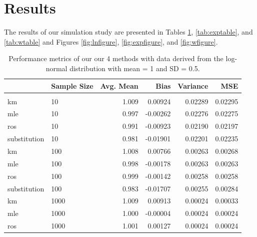 \documentclass[12pt, twoside]{amherstthesis}
\begin{document}
\hypertarget{results}{%
\section{Results}\label{results}}

The results of our simulation study are presented in Tables \ref{tab:lntable}, \ref{tab:exptable}, and \ref{tab:wtable} and Figures \ref{fig:lnfigure}, \ref{fig:expfigure}, and \ref{fig:wfigure}.
\begin{table}

\caption{\label{tab:lntable}Performance metrics of our our 
             4 methods with data derived from the log-normal 
             distribution with mean = 1 and SD = 0.5.}
\centering
\fontsize{11.5}{13.5}\selectfont
\begin{tabular}[t]{llrrrr}
\toprule
  & Sample Size & Avg. Mean & Bias & Variance & MSE\\
\midrule
\addlinespace[0.3em]
\multicolumn{6}{l}{\textbf{Censoring Rate = 0.1}}\\
\hspace{1em}km & 10 & 1.009 & 0.00924 & 0.02289 & 0.02295\\
\hspace{1em}mle & 10 & 0.997 & -0.00262 & 0.02276 & 0.02275\\
\hspace{1em}ros & 10 & 0.991 & -0.00923 & 0.02190 & 0.02197\\
\hspace{1em}substitution & 10 & 0.981 & -0.01901 & 0.02201 & 0.02235\\
\hline
\hspace{1em}km & 100 & 1.008 & 0.00766 & 0.00263 & 0.00268\\
\hspace{1em}mle & 100 & 0.998 & -0.00178 & 0.00263 & 0.00263\\
\hspace{1em}ros & 100 & 0.999 & -0.00142 & 0.00258 & 0.00258\\
\hspace{1em}substitution & 100 & 0.983 & -0.01707 & 0.00255 & 0.00284\\
\hline
\hspace{1em}km & 1000 & 1.009 & 0.00913 & 0.00024 & 0.00033\\
\hspace{1em}mle & 1000 & 1.000 & -0.00004 & 0.00024 & 0.00024\\
\hspace{1em}ros & 1000 & 1.001 & 0.00127 & 0.00024 & 0.00024\\

\end{tabular}
\end{table}
\end{document}
